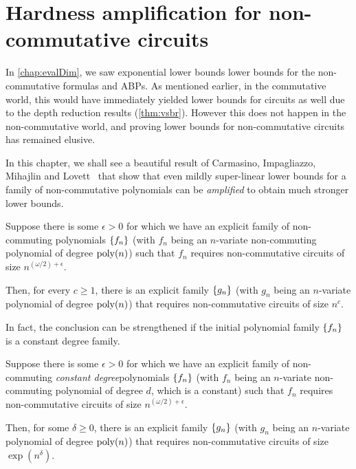 \chapter{Hardness amplification for non-commutative circuits}
\label{chap:nc-hardness-amp}

\newcommand{\Amp}{\operatorname{Amp}}

In \autoref{chap:evalDim}, we saw exponential lower bounds lower bounds for the non-commutative formulas and ABPs. As mentioned earlier, in the commutative world, this would have immediately yielded lower bounds for circuits as well due to the depth reduction results (\autoref{thm:vsbr}). However this does not happen in the non-commutative world, and proving lower bounds for non-commutative circuits has remained elusive.

In this chapter, we shall see a beautiful result of Carmasino, Impagliazzo, Mihajlin and Lovett~\cite{CILM18} that show that even mildly super-linear lower bounds for a family of non-commutative polynomials can be \emph{amplified} to obtain much stronger lower bounds.

\begin{theorem} \label{thm:CILM18-mainthm}
  Suppose there is some $\epsilon > 0$ for which we have an explicit family of non-commuting polynomials $\left\{f_n\right\}$ (with $f_n$ being an $n$-variate non-commuting polynomial of degree $\operatorname{poly}(n)$) such that $f_n$ requires non-commutative circuits of size $n^{(\omega/2) + \epsilon}$.

  Then, for every $c \geq 1$, there is an explicit family $\left\{g_n\right\}$ (with $g_n$ being an $n$-variate polynomial of degree $\operatorname{poly}(n)$) that requires non-commutative circuits of size $n^c$. 
\end{theorem}

In fact, the conclusion can be strengthened if the initial polynomial family $\left\{f_n\right\}$ is a constant degree family.

\begin{theorem} \label{thm:CILM18-mainthm-constdeg}
  Suppose there is some $\epsilon > 0$ for which we have an explicit family of non-commuting \emph{constant degree}polynomials $\left\{f_n\right\}$ (with $f_n$ being an $n$-variate non-commuting polynomial of degree $d$, which is a constant) such that $f_n$ requires non-commutative circuits of size $n^{(\omega/2) + \epsilon}$.

  Then, for some $\delta \geq 0$, there is an explicit family $\left\{g_n\right\}$ (with $g_n$ being an $n$-variate polynomial of degree $\operatorname{poly}(n)$) that requires non-commutative circuits of size $\exp(n^{\delta})$. 
\end{theorem}

